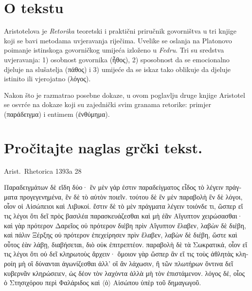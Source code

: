 

\section*{O tekstu}

Aristotelova je \textit{Retorika} teoretski i praktični priručnik govorništva u tri knjige koji se bavi metodama uvjeravanja riječima. Uvelike se oslanja na Platonovo poimanje istinskoga govorničkog umijeća izloženo u \textit{Fedru}. Tri su sredstva uvjeravanja: 1) osobnost govornika \textgreek[variant=ancient]{(ἦθος),} 2) sposobnost da se emocionalno djeluje na slušatelja \textgreek[variant=ancient]{(πάθος)} i 3) umijeće da se iskaz tako oblikuje da djeluje istinito ili vjerojatno \textgreek[variant=ancient]{(λόγος).}

Nakon što je razmatrao posebne dokaze, u ovom poglavlju druge knjige Aristotel se osvrće na dokaze koji su zajednički svim granama retorike: primjer \textgreek[variant=ancient]{(παράδειγμα)} i entimem \textgreek[variant=ancient]{(ἐνθύμημα).}

\section*{Pročitajte naglas grčki tekst.}

Arist.\ Rhetorica 1393a 28


\medskip

\begin{greek}
{\large
{ \noindent Παραδειγμάτων δὲ εἴδη δύο· ἓν μὲν γάρ ἐστιν παραδείγματος εἶδος τὸ λέγειν πράγματα προγεγενημένα, ἓν δὲ τὸ αὐτὸν ποιεῖν. τούτου δὲ ἓν μὲν παραβολὴ ἓν δὲ λόγοι, οἷον οἱ Αἰσώπειοι καὶ Λιβυκοί. ἔστιν δὲ τὸ μὲν πράγματα λέγειν τοιόνδε τι, ὥσπερ εἴ τις λέγοι ὅτι δεῖ πρὸς βασιλέα παρασκευάζεσθαι καὶ μὴ ἐᾶν Αἴγυπτον χειρώσασθαι· καὶ γὰρ πρότερον Δαρεῖος οὐ πρότερον διέβη πρὶν Αἴγυπτον ἔλαβεν, λαβὼν δὲ διέβη, καὶ πάλιν Ξέρξης οὐ πρότερον ἐπεχείρησεν πρὶν ἔλαβεν, λαβὼν δὲ διέβη, ὥστε καὶ οὗτος ἐὰν λάβῃ, διαβήσεται, διὸ οὐκ ἐπιτρεπτέον. παραβολὴ δὲ τὰ Σωκρατικά, οἷον εἴ τις λέγοι ὅτι οὐ δεῖ κληρωτοὺς ἄρχειν· ὅμοιον γὰρ ὥσπερ ἂν εἴ τις τοὺς ἀθλητὰς κληροίη μὴ οἳ δύνανται ἀγωνίζεσθαι ἀλλ' οἳ ἂν λάχωσιν, ἢ τῶν πλωτήρων ὅντινα δεῖ κυβερνᾶν κληρώσειεν, ὡς δέον τὸν λαχόντα ἀλλὰ μὴ τὸν ἐπιστάμενον. λόγος δέ, οἷος ὁ Στησιχόρου περὶ Φαλάριδος καὶ $\langle$ὁ$\rangle$ Αἰσώπου ὑπὲρ τοῦ δημαγωγοῦ.

}
}
\end{greek}


